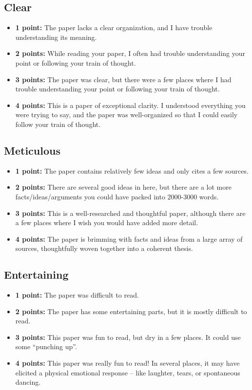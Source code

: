 \documentclass[11pt, letterpaper]{article}
\begin{document}
\subsection*{Clear}

\begin{itemize}
	\item \textbf{1 point:} The paper lacks a clear organization, and I have trouble understanding its meaning.
	\item \textbf{2 points:} While reading your paper, I often had trouble understanding your point or following your train of thought.
	\item \textbf{3 points:} The paper was clear, but there were a few places where I had trouble understanding your point or following your train of thought.
	\item \textbf{4 points:} This is a paper of exceptional clarity. I understood everything you were trying to say, and the paper was well-organized so that I could easily follow your train of thought.
\end{itemize}

\subsection*{Meticulous}

\begin{itemize}
	\item \textbf{1 point:} The paper contains relatively few ideas and only cites a few sources.
	\item \textbf{2 points:} There are several good ideas in here, but there are a lot more facts/ideas/arguments you could have packed into 2000-3000 words.
	\item \textbf{3 points:} This is a well-researched and thoughtful paper, although there are a few places where I wish you would have added more detail.
	\item \textbf{4 points:} The paper is brimming with facts and ideas from a large array of sources, thoughtfully woven together into a coherent thesis.
\end{itemize}


\subsection*{Entertaining}

\begin{itemize}
	\item \textbf{1 point:} The paper was difficult to read. 
	\item \textbf{2 points:} The paper has some entertaining parts, but it is mostly difficult to read.
	\item \textbf{3 points:} This paper was fun to read, but dry in a few places. It could use some ``punching up''.
	\item \textbf{4 points:} This paper was really fun to read! In several places, it may have elicited a physical emotional response -- like laughter, tears, or spontaneous dancing.
\end{itemize}
\end{document}
